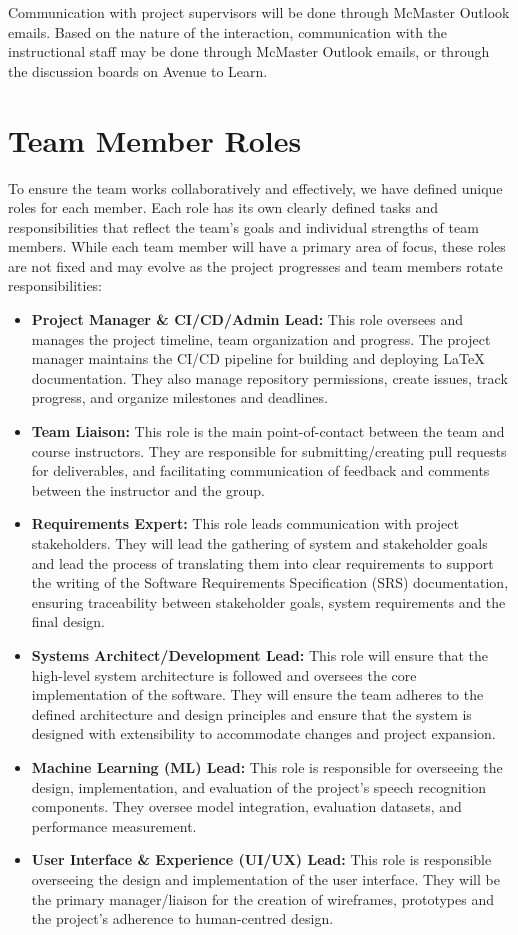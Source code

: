 \documentclass{article}
\begin{document}
\indent Communication with project supervisors will be done through McMaster Outlook emails. Based on the nature of the interaction, communication with the instructional staff may be done through McMaster Outlook emails, or through the discussion boards on Avenue to Learn.


\section{Team Member Roles}

To ensure the team works collaboratively and effectively, we have defined unique roles for each member. Each role has its own clearly 
defined tasks and responsibilities that reflect the team's goals and individual strengths of team members. While each team member will 
have a primary area of focus, these roles are not fixed and may evolve as the project progresses and team members rotate responsibilities:

\begin{itemize}
  \item \textbf{Project Manager \& CI/CD/Admin Lead:} This role oversees and manages the project timeline, team organization and progress. 
  The project manager maintains the CI/CD pipeline for building and
  deploying \LaTeX{} documentation. They also manage repository permissions,
  create issues, track progress, and organize milestones and deadlines.
  \item \textbf{Team Liaison:} This role is the main point-of-contact between the team and course instructors. They are responsible for 
  submitting/creating pull requests for deliverables, and facilitating communication of feedback and comments between the instructor and the 
  group. 
  \item \textbf{Requirements Expert:} This role leads communication with project stakeholders. They will lead the gathering of system and 
  stakeholder goals and lead the process of translating them into clear requirements to support the writing of the Software Requirements 
  Specification (SRS) documentation, ensuring traceability between stakeholder goals, system requirements and the final design. 
  \item \textbf{Systems Architect/Development Lead:} This role will ensure that the high-level system architecture is followed and oversees 
  the core implementation of the software. They will ensure the team adheres to the defined architecture and design principles and ensure 
  that the system is designed with extensibility to accommodate changes and project expansion.
  \item \textbf{Machine Learning (ML) Lead:} This role is responsible for overseeing the design, implementation, and evaluation of the 
  project's speech recognition components. They oversee model integration,
  evaluation datasets, and performance measurement.
  \item \textbf{User Interface \& Experience (UI/UX) Lead:} This role is responsible overseeing the design and implementation of the user 
  interface. They will be the primary manager/liaison for the creation of wireframes, prototypes and the project's adherence to 
  human-centred design. 
\end{itemize}
\end{document}
